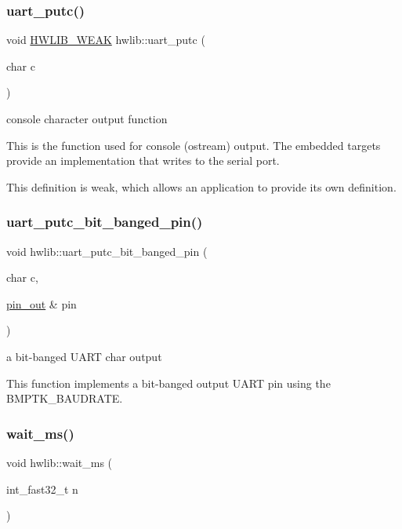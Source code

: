 \subsubsection{\texorpdfstring{uart\+\_\+putc()}{uart\_putc()}}
{\footnotesize\ttfamily void \hyperlink{hwlib-defines_8hpp_a04be4340016df60d6636c1d1c6d94fc9}{H\+W\+L\+I\+B\+\_\+\+W\+E\+AK} hwlib\+::uart\+\_\+putc (\begin{DoxyParamCaption}\item[{char}]{c }\end{DoxyParamCaption})}

console character output function

This is the function used for console (ostream) output. The embedded targets provide an implementation that writes to the serial port.

This definition is weak, which allows an application to provide its own definition. \mbox{\label{namespacehwlib_a68a0d1b033eb1a830df4b2cbdd7ff281}} 
\subsubsection{\texorpdfstring{uart\+\_\+putc\+\_\+bit\+\_\+banged\+\_\+pin()}{uart\_putc\_bit\_banged\_pin()}}
{\footnotesize\ttfamily void hwlib\+::uart\+\_\+putc\+\_\+bit\+\_\+banged\+\_\+pin (\begin{DoxyParamCaption}\item[{char}]{c,  }\item[{\hyperlink{classhwlib_1_1pin__out}{pin\+\_\+out} \&}]{pin }\end{DoxyParamCaption})}

a bit-\/banged U\+A\+RT char output

This function implements a bit-\/banged output U\+A\+RT pin using the B\+M\+P\+T\+K\+\_\+\+B\+A\+U\+D\+R\+A\+TE. \mbox{\label{namespacehwlib_a6119aa5d3034176aa1515ef4bb193044}} 
\subsubsection{\texorpdfstring{wait\+\_\+ms()}{wait\_ms()}}
{\footnotesize\ttfamily void hwlib\+::wait\+\_\+ms (\begin{DoxyParamCaption}\item[{int\+\_\+fast32\+\_\+t}]{n }\end{DoxyParamCaption})}

